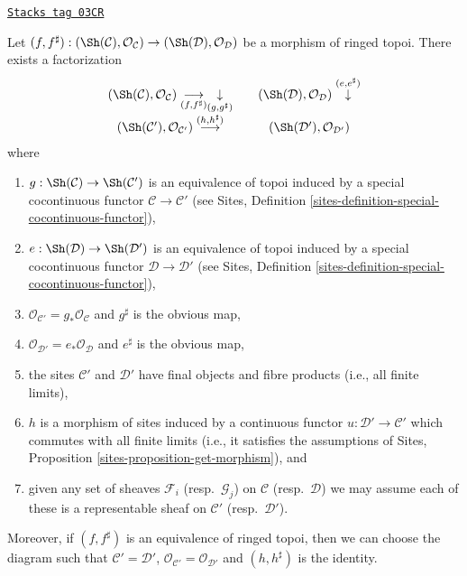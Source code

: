 \begin{lemma}
\label{sites-modules-lemma-morphism-ringed-topoi-comes-from-morphism-ringed-sites}
\href{https://stacks.math.columbia.edu/tag/03CR}{\texttt{Stacks tag 03CR}}

Let $(f, f^\sharp) :
(\Sh(\mathcal{C}), \mathcal{O}_\mathcal{C})
\to (\Sh(\mathcal{D}), \mathcal{O}_\mathcal{D})$
be a morphism of ringed topoi. There exists a factorization
$$
\begin{array}{ccc}(\Sh(\mathcal{C}), \mathcal{O}_\mathcal{C})
\underset{(f, f^\sharp)}{\longrightarrow}\underset{(g, g^\sharp)}{\downarrow} &  & (\Sh(\mathcal{D}), \mathcal{O}_\mathcal{D}) \overset{(e, e^\sharp)}{\downarrow} \\ (\Sh(\mathcal{C}'), \mathcal{O}_{\mathcal{C}'})
\overset{(h, h^\sharp)}{\longrightarrow} &  & (\Sh(\mathcal{D}'), \mathcal{O}_{\mathcal{D}'})\end{array}
$$
where
\begin{enumerate}
\item $g : \Sh(\mathcal{C}) \to \Sh(\mathcal{C}')$
is an equivalence of topoi induced by a special cocontinuous functor
$\mathcal{C} \to \mathcal{C}'$ (see
Sites, Definition \ref{sites-definition-special-cocontinuous-functor}),
\item $e : \Sh(\mathcal{D}) \to \Sh(\mathcal{D}')$
is an equivalence of topoi induced by a special cocontinuous functor
$\mathcal{D} \to \mathcal{D}'$ (see
Sites, Definition \ref{sites-definition-special-cocontinuous-functor}),
\item $\mathcal{O}_{\mathcal{C}'} = g_*\mathcal{O}_\mathcal{C}$
and $g^\sharp$ is the obvious map,
\item $\mathcal{O}_{\mathcal{D}'} = e_*\mathcal{O}_\mathcal{D}$
and $e^\sharp$ is the obvious map,
\item the sites $\mathcal{C}'$ and $\mathcal{D}'$ have final objects
and fibre products (i.e., all finite limits),
\item $h$ is a morphism of sites induced by a continuous functor
$u : \mathcal{D}' \to \mathcal{C}'$ which commutes with all finite limits
(i.e., it satisfies the assumptions of
Sites, Proposition \ref{sites-proposition-get-morphism}), and
\item given any set of sheaves $\mathcal{F}_i$ (resp.\ $\mathcal{G}_j$)
on $\mathcal{C}$ (resp.\ $\mathcal{D}$) we may assume each of these is
a representable sheaf on $\mathcal{C}'$ (resp.\ $\mathcal{D}'$).
\end{enumerate}
Moreover, if $(f, f^\sharp)$ is an equivalence of ringed topoi,
then we can choose the diagram such that
$\mathcal{C}' = \mathcal{D}'$,
$\mathcal{O}_{\mathcal{C}'} = \mathcal{O}_{\mathcal{D}'}$
and $(h, h^\sharp)$ is the identity.
\end{lemma}

